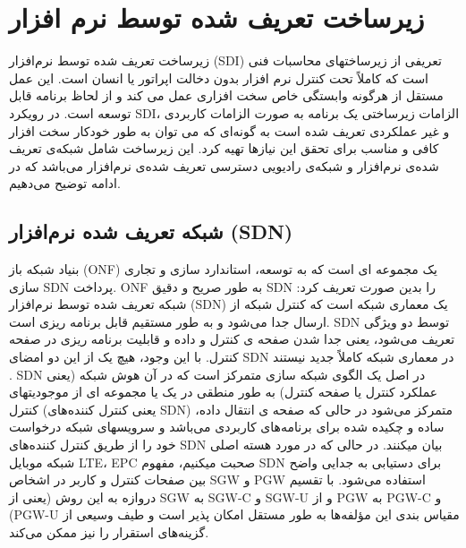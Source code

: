 \section{زیرساخت تعریف شده توسط نرم افزار}
زیر‌ساخت تعریف شده توسط نرم‌افزار (SDI)
تعریفی از زیرساختهای محاسبات فنی است که کاملاً تحت کنترل نرم افزار بدون دخالت اپراتور یا انسان است.
این عمل مستقل از هرگونه وابستگی خاص سخت افزاری عمل می کند و از لحاظ برنامه قابل توسعه است.
در رویکرد SDI، الزامات زیرساختی یک برنامه به صورت  الزامات کاربردی و غیر عملکردی تعریف شده است به گونه‌ای که می توان به طور خودکار سخت افزار کافی و مناسب برای تحقق این نیازها تهیه کرد.
این زیرساخت شامل شبکه‌ی تعریف شده‌ی نرم‌افزار و شبکه‌ی رادیویی دسترسی تعریف شده‌ی نرم‌افزار می‌باشد که در ادامه توضیح می‌دهیم.
\subsection{شبکه تعریف شده نرم‌افزار (SDN)}
بنیاد شبکه باز 
(ONF) 
یک مجموعه ای است که به توسعه، استاندارد سازی و تجاری سازی SDN 
پرداخت.
ONF
 به طور صریح و دقیق SDN را بدین صورت تعریف کرد:
 شبکه تعریف شده توسط نرم‌افزار (SDN) یک معماری شبکه است که کنترل شبکه از ارسال جدا می‌شود و به طور مستقیم قابل برنامه ریزی است.
 SDN توسط دو ویژگی تعریف می‌شود، یعنی جدا شدن صفحه ی کنترل و داده و قابلیت برنامه ریزی در صفحه کنترل.
 با این وجود، هیچ یک از این دو امضای SDN در معماری شبکه کاملاً جدید نیستند
 \cite{SDN1}.
 SDN 
 در اصل یک الگوی شبکه سازی متمرکز است که در آن هوش شبکه (یعنی عملکرد کنترل یا صفحه کنترل) به طور منطقی در یک یا مجموعه ای از موجودیتهای کنترل (یعنی کنترل کننده‌های SDN) متمرکز می‌شود در حالی که صفحه ی انتقال داده،  ساده و چکیده شده برای برنامه‌‌های کاربردی می‌باشد و سرویسهای شبکه درخواست خود را از طریق کنترل کننده‌های SDN
 بیان میکنند.
 در حالی که در مورد هسته اصلی شبکه موبایل LTE، EPC صحبت میکنیم، مفهوم SDN برای دستیابی به جدایی واضح بین صفحات کنترل و کاربر در اشخاص SGW و PGW استفاده می‌شود.
 با تقسیم دروازه به این روش (یعنی از SGW به SGW-C و
SGW-U 
و از PGW به PGW-C و (PGW-U 
  مقیاس بندی این مؤلفه‌‌ها به طور مستقل امکان پذیر است و طیف وسیعی از گزینه‌‌های استقرار را نیز ممکن می‌کند.
  
